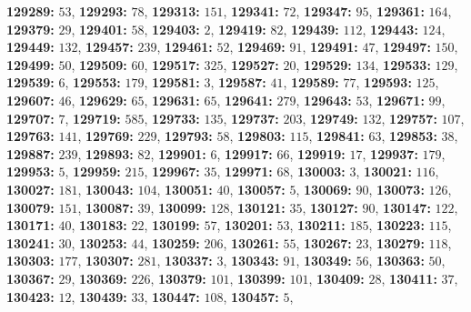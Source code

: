 \textsf{\bfseries 129289:} $53$, \textsf{\bfseries 129293:} $78$, \textsf{\bfseries 129313:} $151$, \textsf{\bfseries 129341:} $72$, \textsf{\bfseries 129347:} $95$, \textsf{\bfseries 129361:} $164$, \textsf{\bfseries 129379:} $29$, \textsf{\bfseries 129401:} $58$, \textsf{\bfseries 129403:} $2$, \textsf{\bfseries 129419:} $82$, \textsf{\bfseries 129439:} $112$, \textsf{\bfseries 129443:} $124$, \textsf{\bfseries 129449:} $132$, \textsf{\bfseries 129457:} $239$, \textsf{\bfseries 129461:} $52$, \textsf{\bfseries 129469:} $91$, \textsf{\bfseries 129491:} $47$, \textsf{\bfseries 129497:} $150$, \textsf{\bfseries 129499:} $50$, \textsf{\bfseries 129509:} $60$, \textsf{\bfseries 129517:} $325$, \textsf{\bfseries 129527:} $20$, \textsf{\bfseries 129529:} $134$, \textsf{\bfseries 129533:} $129$, \textsf{\bfseries 129539:} $6$, \textsf{\bfseries 129553:} $179$, \textsf{\bfseries 129581:} $3$, \textsf{\bfseries 129587:} $41$, \textsf{\bfseries 129589:} $77$, \textsf{\bfseries 129593:} $125$, \textsf{\bfseries 129607:} $46$, \textsf{\bfseries 129629:} $65$, \textsf{\bfseries 129631:} $65$, \textsf{\bfseries 129641:} $279$, \textsf{\bfseries 129643:} $53$, \textsf{\bfseries 129671:} $99$, \textsf{\bfseries 129707:} $7$, \textsf{\bfseries 129719:} $585$, \textsf{\bfseries 129733:} $135$, \textsf{\bfseries 129737:} $203$, \textsf{\bfseries 129749:} $132$, \textsf{\bfseries 129757:} $107$, \textsf{\bfseries 129763:} $141$, \textsf{\bfseries 129769:} $229$, \textsf{\bfseries 129793:} $58$, \textsf{\bfseries 129803:} $115$, \textsf{\bfseries 129841:} $63$, \textsf{\bfseries 129853:} $38$, \textsf{\bfseries 129887:} $239$, \textsf{\bfseries 129893:} $82$, \textsf{\bfseries 129901:} $6$, \textsf{\bfseries 129917:} $66$, \textsf{\bfseries 129919:} $17$, \textsf{\bfseries 129937:} $179$, \textsf{\bfseries 129953:} $5$, \textsf{\bfseries 129959:} $215$, \textsf{\bfseries 129967:} $35$, \textsf{\bfseries 129971:} $68$, \textsf{\bfseries 130003:} $3$, \textsf{\bfseries 130021:} $116$, \textsf{\bfseries 130027:} $181$, \textsf{\bfseries 130043:} $104$, \textsf{\bfseries 130051:} $40$, \textsf{\bfseries 130057:} $5$, \textsf{\bfseries 130069:} $90$, \textsf{\bfseries 130073:} $126$, \textsf{\bfseries 130079:} $151$, \textsf{\bfseries 130087:} $39$, \textsf{\bfseries 130099:} $128$, \textsf{\bfseries 130121:} $35$, \textsf{\bfseries 130127:} $90$, \textsf{\bfseries 130147:} $122$, \textsf{\bfseries 130171:} $40$, \textsf{\bfseries 130183:} $22$, \textsf{\bfseries 130199:} $57$, \textsf{\bfseries 130201:} $53$, \textsf{\bfseries 130211:} $185$, \textsf{\bfseries 130223:} $115$, \textsf{\bfseries 130241:} $30$, \textsf{\bfseries 130253:} $44$, \textsf{\bfseries 130259:} $206$, \textsf{\bfseries 130261:} $55$, \textsf{\bfseries 130267:} $23$, \textsf{\bfseries 130279:} $118$, \textsf{\bfseries 130303:} $177$, \textsf{\bfseries 130307:} $281$, \textsf{\bfseries 130337:} $3$, \textsf{\bfseries 130343:} $91$, \textsf{\bfseries 130349:} $56$, \textsf{\bfseries 130363:} $50$, \textsf{\bfseries 130367:} $29$, \textsf{\bfseries 130369:} $226$, \textsf{\bfseries 130379:} $101$, \textsf{\bfseries 130399:} $101$, \textsf{\bfseries 130409:} $28$, \textsf{\bfseries 130411:} $37$, \textsf{\bfseries 130423:} $12$, \textsf{\bfseries 130439:} $33$, \textsf{\bfseries 130447:} $108$, \textsf{\bfseries 130457:} $5$, 
